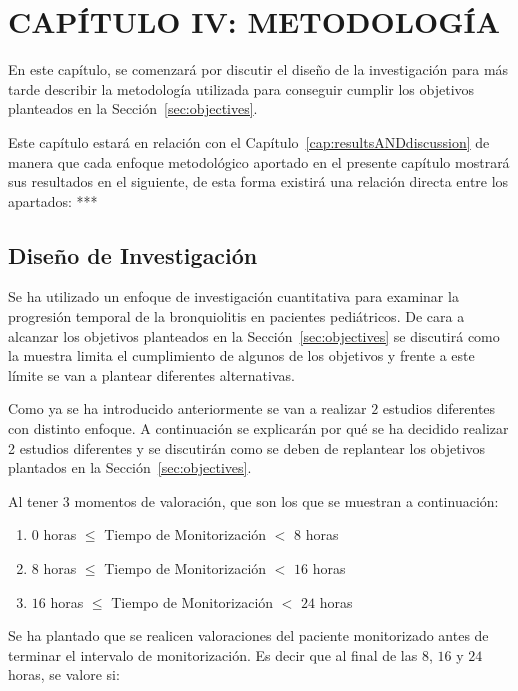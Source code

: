 \section{CAPÍTULO IV: METODOLOGÍA}\label{cap:methodology}

En este capítulo, se comenzará por discutir el diseño de la investigación para más tarde describir la metodología utilizada para conseguir cumplir los objetivos planteados en la Sección~\ref{sec:objectives}. 

Este capítulo estará en relación con el Capítulo~\ref{cap:resultsANDdiscussion} de manera que cada enfoque metodológico aportado en el presente capítulo mostrará sus resultados en el siguiente, de esta forma existirá una relación directa entre los apartados: *** 


\subsection{Diseño de Investigación}

Se ha utilizado un enfoque de investigación cuantitativa para examinar la progresión temporal de la bronquiolitis en pacientes pediátricos. De cara a alcanzar los objetivos planteados en la Sección~\ref{sec:objectives} se discutirá como la muestra limita el cumplimiento de algunos de los objetivos y frente a este límite se van a plantear diferentes alternativas. 

Como ya se ha introducido anteriormente se van a realizar $2$ estudios diferentes con distinto enfoque. A continuación se explicarán por qué se ha decidido realizar 2 estudios diferentes y se discutirán como se deben de replantear los objetivos plantados en la Sección~\ref{sec:objectives}.

Al tener 3 momentos de valoración, que son los que se muestran a continuación:

\begin{enumerate}
    \item $0$ horas $\leq$ Tiempo de Monitorización $<$ $8$ horas 
    \item $8$ horas $\leq$ Tiempo de Monitorización $<$ $16$ horas
    \item $16$ horas $\leq$ Tiempo de Monitorización $<$ $24$ horas
\end{enumerate}


Se ha plantado que se realicen valoraciones del paciente monitorizado antes de terminar el intervalo de monitorización. Es decir que al final de las $8$, $16$ y $24$ horas, se valore si: 

